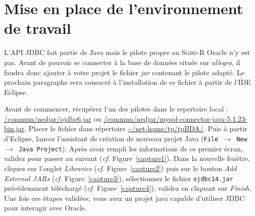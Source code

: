 \documentclass[a4paper,11pt]{article}
\begin{document}
\section{Mise en place de l'environnement de travail}

L'API JDBC fait partie de Java mais le pilote propre au \textsc{Sgbd-R} Oracle n'y est pas. Avant de pouvoir se connecter 
à la base de données située sur \emph{allegro}, il faudra donc ajouter à votre projet le fichier \emph{jar} contenant le pilote 
adapté. Le prochain paragraphe sera consacré à l'installation de ce fichier à partir de l'IDE Eclipse.

Avant de commencer, récupérez l'un des pilotes dans le repertoire local : \url{/commun/nedjar/ojdbc6.jar} ou 
\url{/commun/nedjar/mysql-connector-java-5.1.23-bin.jar}. 
Placer le fichier dans répertoire \url{~/net-home/tp/tpBDA/}. Puis à partir d'Eclipse, lancez 
l'assistant de création de nouveau projet Java (\texttt{File $\rightarrow$ New $\rightarrow$ Java Project}).
Après avoir rempli les informations de ce premier écran, validez pour passer au suivant (\emph{cf.} Figure~\ref{capture1}).
Dans la nouvelle fenêtre, cliquez sur l'onglet \emph{Libraries} (\emph{cf.} Figure~\ref{capture2})
puis sur le bouton \emph{Add External JARs} (\emph{cf.} Figure~\ref{capture3}), sélectionnez le fichier \texttt{ojdbc14.jar} 
précédemment téléchargé (\emph{cf.} Figure~\ref{capture4}), validez en cliquant sur \emph{Finish}. Une fois ces étapes validées, 
vous avez un projet java capable d'utiliser JDBC pour interagir avec Oracle.
\end{document}
